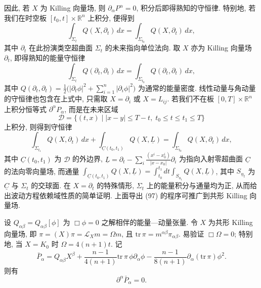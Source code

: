 因此, 若 $X$ 为 Killing 向量场, 则 $\partial_\alpha P^\alpha=0$, 积分后即得熟知的守恒律. 特别地, 若我们在时空板 $[t_0,t]\times\mathbb{R}^n$ 上积分, 便得到
\begin{equation}
\int_{\Sigma_t}Q(X,\partial_t)\,dx=\int_{\Sigma_{t_0}}Q(X,\partial_t)\,dx,\end{equation}
其中 $\partial_t$ 在此扮演类空超曲面 $\Sigma_t$ 的未来指向单位法向. 取 $X$ 亦为 Killing 向量场 $\partial_t$, 即得熟知的能量守恒律
\begin{equation}
\int_{\Sigma_t}Q(\partial_t,\partial_t)\,dx=\int_{\Sigma_{t_0}}Q(\partial_t,\partial_t)\,dx,\end{equation}
其中 $Q(\partial_t,\partial_t)=\frac12\bigl(|\partial_t\phi|^2+\sum_{i=1}^n|\partial_i\phi|^2\bigr)$ 为通常的能量密度. 线性动量与角动量的守恒律也包含在上式中, 只需取 $X=\partial_i$ 或 $X=L_{ij}$.
若我们不在板 $[0,T]\times\mathbb{R}^n$ 上积分恒等式 $\partial^\alpha P_\alpha$, 而是在未来区域
\begin{equation}
\mathcal{D}=\{(t,x)\mid |x-y|\leq T-t,\; t_0\leq t\leq t_1\leq T\}
\end{equation}
上积分, 则得到守恒律
\begin{equation}
\int_{\Sigma_{t_1}}Q(X,\partial_t)\,dx+\int_{\underline{C}(t_0,t_1)}Q(X,\underline{L})=\int_{\Sigma_{t_0}}Q(X,\partial_t)\,dx,\end{equation}
其中 $\underline{C}(t_0,t_1)$ 为 $\mathcal{D}$ 的外边界, $\underline{L}=\partial_t-\sum_i\frac{(x^i-x_0^i)}{|x-x_0|}\partial_i$ 为指向入射零超曲面 $\underline{C}$ 的法向零向量场, 而通量 $\int_{\underline{C}(t_0,t_1)}Q(X,\underline{L})=\int_{t_0}^{t_1}dt\int_{S_{\underline{u}_t}}Q(X,\underline{L})$, 其中 $S_{\underline{u}_t}$ 为 $\underline{C}$ 与 $\Sigma_t$ 的交球面. 在 $X=\partial_t$ 的特殊情形, $ \Sigma_t $ 上的能量积分与通量均为正, 从而给出波动方程依赖域性质的简单证明.
上面导出 (97) 的程序可推广到共形 Killing 向量场.
\begin{proposition}\label{prop:4.10}
设 $Q_{\alpha\beta}=Q_{\alpha\beta}[\phi]$ 为 $\Box\phi=0$ 之解相伴的能量---动量张量. 令 $X$ 为共形 Killing 向量场, 即 $\pi=(X)\pi=\mathcal{L}_X m=\Omega m$, 且 $\mathrm{tr}\,\pi=m^{\alpha\beta}\pi_{\alpha\beta}$. 易验证 $\Box\Omega=0$; 特别地, 当 $X=K_0$ 时 $\Omega=4(n+1)t$. 记
\begin{equation}
\bar P_\alpha=Q_{\alpha\beta}X^\beta+\frac{n-1}{4(n+1)}\mathrm{tr}\,\pi\,\phi\partial_\alpha\phi-\frac{n-1}{8(n+1)}\partial_\alpha(\mathrm{tr}\,\pi)\phi^2.\end{equation}
则有
\begin{equation}
\partial^\alpha\bar P_\alpha=0.\end{equation}
\end{proposition}

